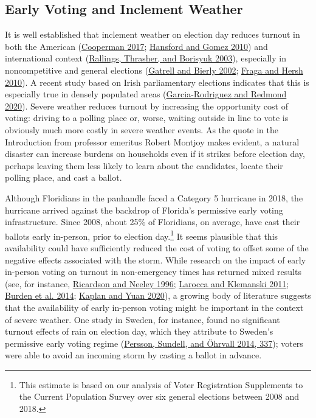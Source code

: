 \documentclass[
  12pt,
]{article}
\begin{document}
\hypertarget{early-voting-and-inclement-weather}{%
\subsection*{Early Voting and Inclement Weather}\label{early-voting-and-inclement-weather}}

It is well established that inclement weather on election day reduces turnout in both the American (\protect\hyperlink{ref-Cooperman2017}{Cooperman 2017}; \protect\hyperlink{ref-Hansford2010}{Hansford and Gomez 2010}) and international context (\protect\hyperlink{ref-Rallings2003}{Rallings, Thrasher, and Borisyuk 2003}), especially in noncompetitive and general elections (\protect\hyperlink{ref-Gatrell2002}{Gatrell and Bierly 2002}; \protect\hyperlink{ref-Fraga2010}{Fraga and Hersh 2010}). A recent study based on Irish parliamentary elections indicates that this is especially true in densely populated areas (\protect\hyperlink{ref-Garcia-Rodriguez2020}{Garcia-Rodriguez and Redmond 2020}). Severe weather reduces turnout by increasing the opportunity cost of voting: driving to a polling place or, worse, waiting outside in line to vote is obviously much more costly in severe weather events. As the quote in the Introduction from professor emeritus Robert Montjoy makes evident, a natural disaster can increase burdens on households even if it strikes before election day, perhaps leaving them less likely to learn about the candidates, locate their polling place, and cast a ballot.

Although Floridians in the panhandle faced a Category 5 hurricane in 2018, the hurricane arrived against the backdrop of Florida's permissive early voting infrastructure. Since 2008, about 25\% of Floridians, on average, have cast their ballots early in-person, prior to election day.\footnote{This estimate is based on our analysis of Voter Registration Supplements to the Current Population Survey over six general elections between 2008 and 2018.} It seems plausible that this availability could have sufficiently reduced the cost of voting to offset some of the negative effects associated with the storm. While research on the impact of early in-person voting on turnout in non-emergency times has returned mixed results (see, for instance, \protect\hyperlink{ref-Ricardson1996}{Ricardson and Neeley 1996}; \protect\hyperlink{ref-Larocca2011}{Larocca and Klemanski 2011}; \protect\hyperlink{ref-Burden2014}{Burden et al. 2014}; \protect\hyperlink{ref-Kaplan2020}{Kaplan and Yuan 2020}), a growing body of literature suggests that the availability of early in-person voting might be important in the context of severe weather. One study in Sweden, for instance, found no significant turnout effects of rain on election day, which they attribute to Sweden's permissive early voting regime (\protect\hyperlink{ref-Persson2014}{Persson, Sundell, and Öhrvall 2014, 337}); voters were able to avoid an incoming storm by casting a ballot in advance.
\end{document}
